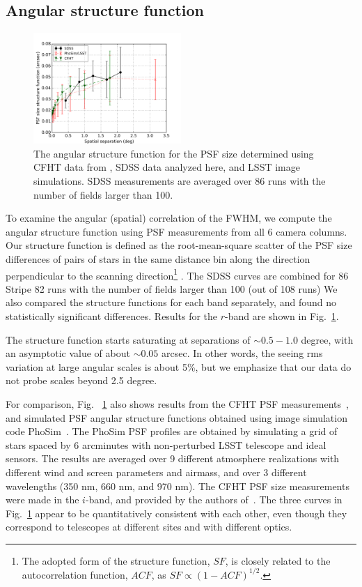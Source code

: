 \subsection{Angular structure function} 

\begin{figure}[th]
\centering
\includegraphics[width=0.5\textwidth]{FIGURES/spatial.png}
\caption{The angular structure function for the PSF size determined using 
  CFHT data from \cite{heymans2012}, SDSS data analyzed here, and LSST image simulations. 
  SDSS measurements are averaged over 86 runs with the number of fields larger than 100. 
\label{fig:spatial}}
\end{figure}

To examine the angular (spatial) correlation of the FWHM, we compute the angular
structure function using PSF measurements from all 6 camera columns.
Our structure function is defined as the root-mean-square scatter of the PSF size 
differences of pairs of stars in the same distance bin along the direction perpendicular
to the scanning direction\footnote{The adopted form 
of the structure function, $SF$, is closely related to the autocorrelation function, $ACF$, as 
$SF \propto (1-ACF)^{1/2}$.} .
The SDSS curves are combined for 86 Stripe 82 runs with the number of fields larger than 
100 (out of 108 runs) 
We also compared the structure functions for each band
separately, and found no statistically significant differences.
Results for the $r$-band are shown in Fig.~\ref{fig:spatial}.

The structure function starts saturating at separations of
$\sim 0.5 - 1.0$ degree, with an asymptotic value of about $\sim 0.05$ arcsec.
In other words, the seeing rms variation at large angular scales is about 5\%,
but we emphasize that our data do not probe scales beyond 2.5 degree. 

For comparison, Fig. ~\ref{fig:spatial} also shows results from the CFHT PSF 
measurements~\citep{heymans2012}, and simulated PSF angular
structure functions obtained using image simulation code PhoSim~\citep{phosim}. 
The PhoSim PSF profiles are obtained by simulating a grid of stars
spaced by 6 arcminutes with non-perturbed LSST telescope and ideal sensors.
The results are averaged over 9 different atmosphere realizations with
different wind and screen parameters and airmass, and over 3 different
wavelengths (350 nm, 660 nm, and 970 nm).
The CFHT PSF size measurements were made in the $i$-band, and provided
by the authors of~\cite{heymans2012}.
The three curves in Fig.~\ref{fig:spatial} appear to be quantitatively
consistent with each other, even though they correspond to telescopes at
different sites and with different optics. 

